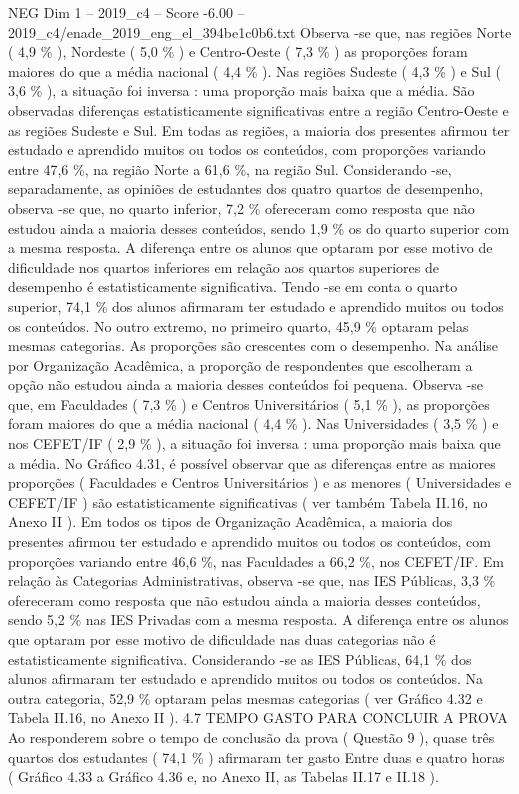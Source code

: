 \begin{textsample}{NEG Dim 1 – 2019\_c4 – Score -6.00 – 2019\_c4/enade\_2019\_eng\_el\_394be1c0b6.txt}
Observa -se que, nas regiões Norte ( 4,9 \% ), Nordeste ( 5,0 \% ) e Centro-Oeste ( 7,3 \% ) as proporções foram maiores do que a média nacional ( 4,4 \% ).
Nas regiões Sudeste ( 4,3 \% ) e Sul ( 3,6 \% ), a situação foi inversa : uma proporção mais baixa que a média.
São observadas diferenças estatisticamente significativas entre a região Centro-Oeste e as regiões Sudeste e Sul.
Em todas as regiões, a maioria dos presentes afirmou ter estudado e aprendido muitos ou todos os conteúdos, com proporções variando entre 47,6 \%, na região Norte a 61,6 \%, na região Sul.
Considerando -se, separadamente, as opiniões de estudantes dos quatro quartos de desempenho, observa -se que, no quarto inferior, 7,2 \% ofereceram como resposta que não estudou ainda a maioria desses conteúdos, sendo 1,9 \% os do quarto superior com a mesma resposta.
A diferença entre os alunos que optaram por esse motivo de dificuldade nos quartos inferiores em relação aos quartos superiores de desempenho é estatisticamente significativa.
Tendo -se em conta o quarto superior, 74,1 \% dos alunos afirmaram ter estudado e aprendido muitos ou todos os conteúdos.
No outro extremo, no primeiro quarto, 45,9 \% optaram pelas mesmas categorias.
As proporções são crescentes com o desempenho.
Na análise por Organização Acadêmica, a proporção de respondentes que escolheram a opção não estudou ainda a maioria desses conteúdos foi pequena.
Observa -se que, em Faculdades ( 7,3 \% ) e Centros Universitários ( 5,1 \% ), as proporções foram maiores do que a média nacional ( 4,4 \% ).
Nas Universidades ( 3,5 \% ) e nos CEFET/IF ( 2,9 \% ), a situação foi inversa : uma proporção mais baixa que a média.
No Gráfico 4.31, é possível observar que as diferenças entre as maiores proporções ( Faculdades e Centros Universitários ) e as menores ( Universidades e CEFET/IF ) são estatisticamente significativas ( ver também Tabela II.16, no Anexo II ).
Em todos os tipos de Organização Acadêmica, a maioria dos presentes afirmou ter estudado e aprendido muitos ou todos os conteúdos, com proporções variando entre 46,6 \%, nas Faculdades a 66,2 \%, nos CEFET/IF.
Em relação às Categorias Administrativas, observa -se que, nas IES Públicas, 3,3 \% ofereceram como resposta que não estudou ainda a maioria desses conteúdos, sendo 5,2 \% nas IES Privadas com a mesma resposta.
A diferença entre os alunos que optaram por esse motivo de dificuldade nas duas categorias não é estatisticamente significativa.
Considerando -se as IES Públicas, 64,1 \% dos alunos afirmaram ter estudado e aprendido muitos ou todos os conteúdos.
Na outra categoria, 52,9 \% optaram pelas mesmas categorias ( ver Gráfico 4.32 e Tabela II.16, no Anexo II ). 4.7 TEMPO GASTO PARA CONCLUIR A PROVA Ao responderem sobre o tempo de conclusão da prova ( Questão 9 ), quase três quartos dos estudantes ( 74,1 \% ) afirmaram ter gasto Entre duas e quatro horas ( Gráfico 4.33 a Gráfico 4.36 e, no Anexo II, as Tabelas II.17 e II.18 ).

\end{textsample}
